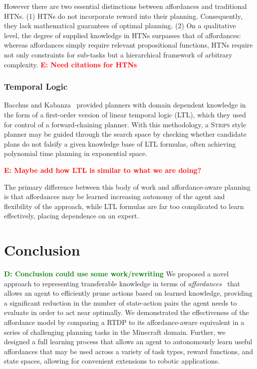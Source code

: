 \documentclass[conference]{IEEEtran}
\newcommand{\dnote}[1]{\textcolor{Green}{\textbf{D: #1}}}
\newcommand{\enote}[1]{\textcolor{Red}{\textbf{E: #1}}}
\begin{document}
However there are two essential distinctions between affordances and traditional HTNs.  (1) HTNs do not incorporate reward into their planning. Consequently, they lack mathematical guarantees of optimal planning. (2) On a qualitative level, the degree of supplied knowledge in HTNs surpasses that of affordances: whereas affordances simply require relevant propositional functions, HTNs require not only constraints for sub-tasks but a hierarchical framework of arbitrary complexity. \enote{Need citations for HTNs}

\subsubsection{Temporal Logic}

Bacchus and Kabanza~\cite{Bacchus95usingtemporal,Bacchus99usingtemporal} provided
planners with domain dependent knowledge in the form of a first-order version of linear
temporal logic (LTL), which they used for control of a forward-chaining planner. With this methodology, 
a \textsc{Strips} style planner may be guided through the search space by checking 
whether candidate plans do not falsify a given knowledge base of LTL formulas, often
achieving polynomial time planning in exponential space.

\enote{Maybe add how LTL is similar to what we are doing?}

The primary difference between this body of work and affordance-aware planning is that
affordances may be learned increasing autonomy of the agent and flexibility of the approach, while LTL formulas are far
too complicated to learn effectively, placing dependence on an expert.

\section{Conclusion}
\label{sec:conclusion}
\dnote{Conclusion could use some work/rewriting}
We proposed a novel approach to representing transferable knowledge in terms of
{\em affordances}~\cite{gibson77} that allows an agent to efficiently prune actions 
based on learned knowledge, providing a significant reduction in the number of state-action
pairs the agent needs to evaluate in order to act near optimally. We demonstrated the 
effectiveness of the affordance model by comparing a RTDP to its affordance-aware
equivalent in a series of challenging planning tasks in the Minecraft domain. Further, we designed
a full learning process that allows an agent to autonomously learn useful affordances that may be used
across a variety of task types, reward functions, and state spaces, allowing for convenient extensions 
to robotic applications.
\end{document}
